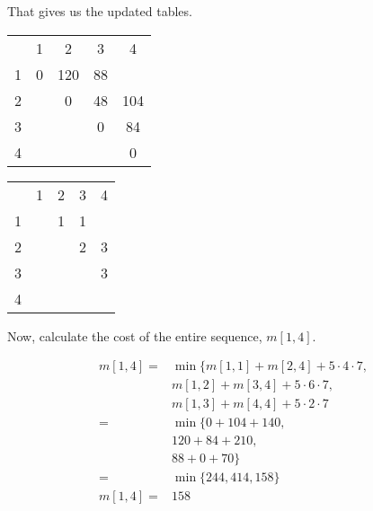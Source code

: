 \documentclass{article}
\begin{document}
\newpage

That gives us the updated tables.
\begin{center}
\label*{$m$}
\begin{tabular}{ c|c|c|c|c| }
    \multicolumn{1}{c}{}
    & \multicolumn{1}{c}{1}
    & \multicolumn{1}{c}{2}
    & \multicolumn{1}{c}{3}
    & \multicolumn{1}{c}{4}\\

    \cline{2-5}
        1 & 0 & 120 & 88 &  \\
    \cline{2-5}
        2 &  & 0 & 48 & 104 \\
    \cline{2-5}
        3 &  &  & 0 & 84 \\
    \cline{2-5}
        4 &  &  &  & 0 \\
    \cline{2-5}
\end{tabular}
\end{center}

\begin{center}
\label*{$s$}
\begin{tabular}{ c|c|c|c|c| }
    \multicolumn{1}{c}{}
    & \multicolumn{1}{c}{1}
    & \multicolumn{1}{c}{2}
    & \multicolumn{1}{c}{3}
    & \multicolumn{1}{c}{4}\\

    \cline{2-5}
        1 &  & 1 & 1 &  \\
    \cline{2-5}
        2 &  &  & 2 & 3 \\
    \cline{2-5}
        3 &  &  &  & 3 \\
    \cline{2-5}
        4 &  &  &  &  \\
    \cline{2-5}
\end{tabular}
\end{center}



Now, calculate the cost of the entire sequence, $m[1, 4]$.

\begin{equation*}
    \begin{split}
        m[1, 4] = & \min\{ m[1, 1] + m[2, 4] + 5\cdot4\cdot7,\\
                  & m[1, 2] + m[3, 4] + 5\cdot6\cdot7, \\
                  & m[1, 3] + m[4, 4] + 5\cdot2\cdot7 \\
                = & \min\{ 0+104+140,\\
                  & 120+84+210, \\
                  & 88+0+70 \}\\
                = & \min\{ 244, 414, 158\}\\
        m[1, 4] = & 158
    \end{split}
\end{equation*}
\end{document}
